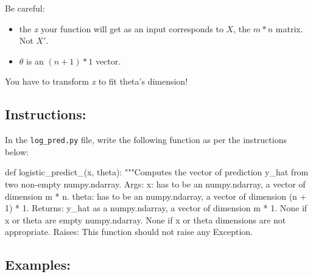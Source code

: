 \documentclass[]{article}
\newenvironment{Shaded}{\begin{snugshade}}{\end{snugshade}}
\newcommand{\CommentTok}[1]{\textcolor[rgb]{0.48,0.49,0.49}{#1}}
\newcommand{\KeywordTok}[1]{\textcolor[rgb]{0.81,0.81,0.76}{#1}}
\newcommand{\NormalTok}[1]{\textcolor[rgb]{0.81,0.81,0.76}{#1}}
\begin{document}
Be careful:

\begin{itemize}
\item
  the \emph{x} your function will get as an input corresponds to \(X\),
  the \(m * n\) matrix. Not \(X'\).
\item
  \(\theta\) is an \((n + 1) * 1\) vector.
\end{itemize}

You have to transform \emph{x} to fit theta's dimension!

\hypertarget{instructions-3}{%
\subsection{Instructions:}\label{instructions-3}}

In the \texttt{log\_pred.py} file, write the following function as per
the instructions below:

\begin{Shaded}
\begin{Highlighting}[]
\KeywordTok{def}\NormalTok{ logistic_predict_(x, theta):}
     \CommentTok{"""Computes the vector of prediction y_hat from two non-empty numpy.ndarray.}
\CommentTok{    Args:}
\CommentTok{      x: has to be an numpy.ndarray, a vector of dimension m * n.}
\CommentTok{      theta: has to be an numpy.ndarray, a vector of dimension (n + 1) * 1.}
\CommentTok{    Returns:}
\CommentTok{      y_hat as a numpy.ndarray, a vector of dimension m * 1.}
\CommentTok{      None if x or theta are empty numpy.ndarray.}
\CommentTok{      None if x or theta dimensions are not appropriate.}
\CommentTok{    Raises:}
\CommentTok{      This function should not raise any Exception.}
\end{Highlighting}
\end{Shaded}

\hypertarget{examples-3}{%
\subsection{Examples:}\label{examples-3}}
\end{document}
